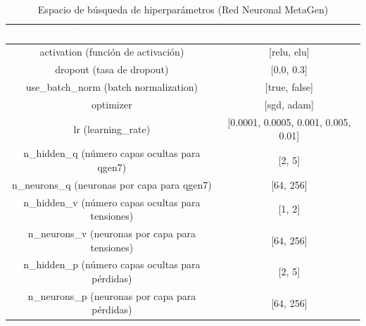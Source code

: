 \begin{table}[htp]
	\centering
	\renewcommand{\arraystretch}{1.3}
		\begin{tabular}{ | c | c | }
			\hline
			\rowcolor[HTML]{5B9BD5} 
			\textcolor{white}{\textbf{Hiperparámetro}} & \textcolor{white}{\textbf{Espacio de búsqueda}}\\
			\hline
			
			activation (función de activación) & [relu, elu] \\
			\hline
			dropout (tasa de dropout)& [0.0, 0.3] \\
			\hline
			use\_batch\_norm (batch normalization) & [true, false] \\
			\hline
			optimizer & [sgd, adam] \\
			\hline
			lr (learning\_rate) & [0.0001, 0.0005, 0.001, 0.005, 0.01] \\
			\hline
			n\_hidden\_q (número capas ocultas para qgen7) & [2, 5] \\
			\hline
			n\_neurons\_q (neuronas por capa para qgen7) & [64, 256] \\
			\hline
			n\_hidden\_v (número capas ocultas para tensiones) & [1, 2] \\
			\hline
			n\_neurons\_v (neuronas por capa para tensiones) & [64, 256] \\
			\hline
			n\_hidden\_p (número capas ocultas para pérdidas) & [2, 5] \\
			\hline
			n\_neurons\_p (neuronas por capa para pérdidas) & [64, 256] \\
			\hline
			
		\end{tabular} 
		
		\caption{Espacio de búsqueda de hiperparámetros (Red Neuronal MetaGen)}
	\end{table}